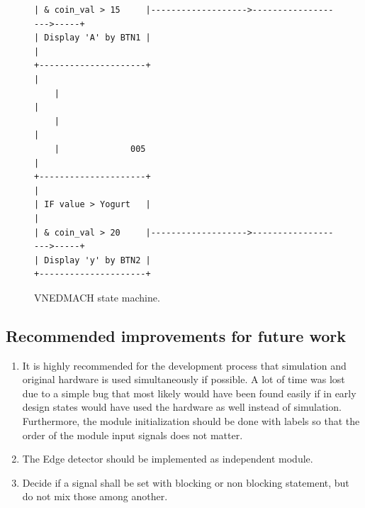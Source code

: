 \begin{figure}[H]
\begin{verbatim}
| & coin_val > 15     |------------------->------------------->-----+
| Display 'A' by BTN1 |                                             |
+---------------------+                                             |
    |                                                               |
    |                                                               |
    |              005                                              |
+---------------------+                                             |
| IF value > Yogurt   |                                             |
| & coin_val > 20     |------------------->------------------->-----+
| Display 'y' by BTN2 |                                           
+---------------------+            

	\end{verbatim}
	\caption{VNEDMACH state machine.}\label{fig: VNEDMACH state machine}
\end{figure}

\subsection{Recommended improvements for future work}\label{subsec: Recommended improvements for future work}
\begin{enumerate}
	\item It is highly recommended for the development process that simulation and original hardware is used simultaneously if possible. A lot of time was lost due to a simple bug that most likely would have been found easily if in early design states would have used the hardware as well instead of simulation. Furthermore, the module initialization should be done with labels so that the order of the module input signals does not matter.
	\item The Edge detector should be implemented as independent module.
	\item Decide if a signal shall be set with blocking or non blocking statement, but do not mix those among another.
\end{enumerate}





